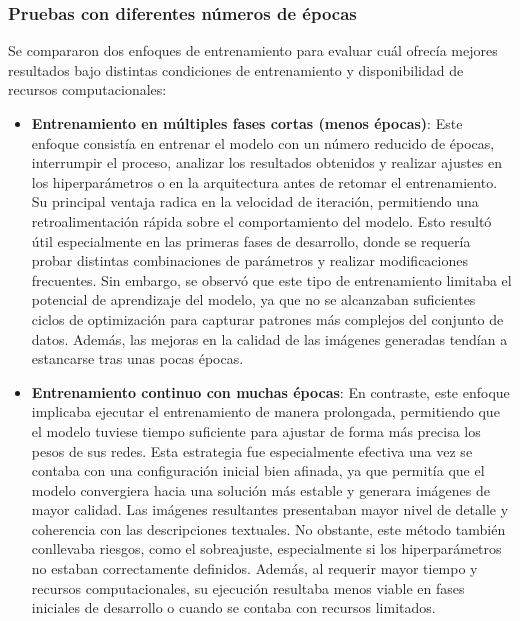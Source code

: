 \subsubsection{Pruebas con diferentes números de épocas}
Se compararon dos enfoques de entrenamiento para evaluar cuál ofrecía mejores resultados bajo distintas condiciones de entrenamiento y disponibilidad de recursos computacionales:

\begin{itemize}
\item \textbf{Entrenamiento en múltiples fases cortas (menos épocas)}: Este enfoque consistía en entrenar el modelo con un número reducido de épocas, interrumpir el proceso, analizar los resultados obtenidos y realizar ajustes en los hiperparámetros o en la arquitectura antes de retomar el entrenamiento. Su principal ventaja radica en la velocidad de iteración, permitiendo una retroalimentación rápida sobre el comportamiento del modelo. Esto resultó útil especialmente en las primeras fases de desarrollo, donde se requería probar distintas combinaciones de parámetros y realizar modificaciones frecuentes. Sin embargo, se observó que este tipo de entrenamiento limitaba el potencial de aprendizaje del modelo, ya que no se alcanzaban suficientes ciclos de optimización para capturar patrones más complejos del conjunto de datos. Además, las mejoras en la calidad de las imágenes generadas tendían a estancarse tras unas pocas épocas.

\item \textbf{Entrenamiento continuo con muchas épocas}: En contraste, este enfoque implicaba ejecutar el entrenamiento de manera prolongada, permitiendo que el modelo tuviese tiempo suficiente para ajustar de forma más precisa los pesos de sus redes. Esta estrategia fue especialmente efectiva una vez se contaba con una configuración inicial bien afinada, ya que permitía que el modelo convergiera hacia una solución más estable y generara imágenes de mayor calidad. Las imágenes resultantes presentaban mayor nivel de detalle y coherencia con las descripciones textuales. No obstante, este método también conllevaba riesgos, como el sobreajuste, especialmente si los hiperparámetros no estaban correctamente definidos. Además, al requerir mayor tiempo y recursos computacionales, su ejecución resultaba menos viable en fases iniciales de desarrollo o cuando se contaba con recursos limitados.

\end{itemize}


